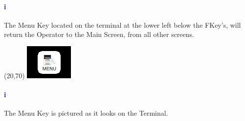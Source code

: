 \paragraph{\textbf{\LARGE \textcolor{blue}{i}}}
The Menu Key located on the terminal at the lower left below the FKey's, will return the Operator to the Main Screen, from all other screens.\\
\begin{minipage}{4cm}
	\begin{picture}(20,70)
		\includegraphics[width=.5\linewidth]{screen-captures/menu}
	\end{picture}
\end{minipage}\begin{minipage}[]{11cm}
	\paragraph{\textbf{\LARGE \textcolor{blue}{i}}} The Menu Key is pictured as it looks on the Terminal.
\end{minipage}
\pagebreak
